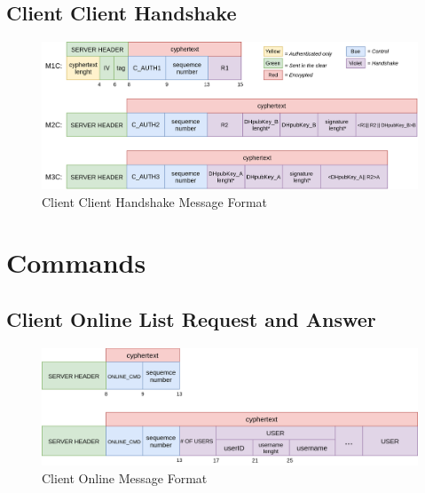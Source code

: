 \documentclass[11pt]{report}
\begin{document}
\subsection*{Client Client Handshake}
\begin{figure}[H]
	\centering
	\includegraphics[scale=0.22]{img/AuthClientClient_messageFormat.png}
	\caption{Client Client Handshake Message Format}
	\label {img: FormatClientClient}
\end{figure}
\newpage
\section{Commands}
\subsection*{Client Online List Request and Answer }
\begin{figure}[H]
	\centering
	\includegraphics[scale=0.25]{img/ClientOnline_messageFormat.png}
	\caption{Client Online Message Format}
	\label {img: FormatClientOnline}
\end{figure}
\end{document}
